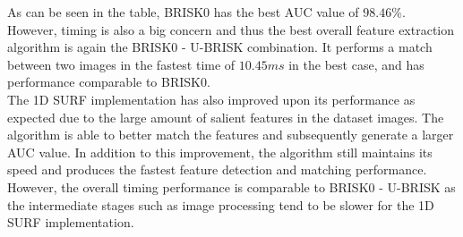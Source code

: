 \documentclass{report}
\begin{document}
As can be seen in the table, BRISK0 has the best AUC value of $98.46\%$. However, timing is also a big concern and thus the best overall feature extraction algorithm is again the BRISK0 - U-BRISK combination. It performs a match between two images in the fastest time of $10.45 ms$ in the best case, and has performance comparable to BRISK0.\\  

The 1D SURF implementation has also improved upon its performance as expected due to the large amount of salient features in the dataset images. The algorithm is able to better match the features and subsequently generate a larger AUC value. In addition to this improvement, the algorithm still maintains its speed and produces the fastest feature detection and matching performance. However, the overall timing performance is comparable to BRISK0 - U-BRISK as the intermediate stages such as image processing tend to be slower for the 1D SURF implementation.\\



\end{document}

